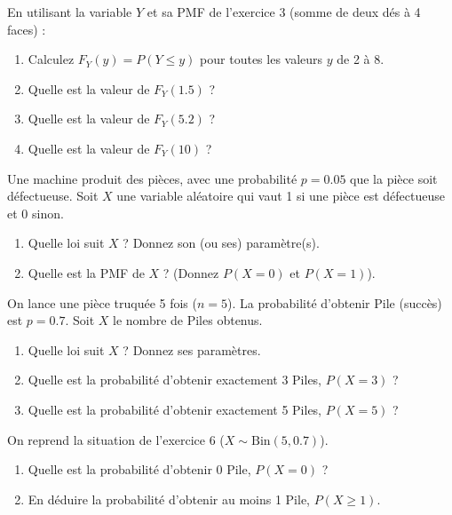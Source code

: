 \begin{exercicebox}
En utilisant la variable $Y$ et sa PMF de l'exercice 3 (somme de deux dés à 4 faces) :
\begin{enumerate}
    \item Calculez $F_Y(y) = P(Y \le y)$ pour toutes les valeurs $y$ de 2 à 8.
    \item Quelle est la valeur de $F_Y(1.5)$ ?
    \item Quelle est la valeur de $F_Y(5.2)$ ?
    \item Quelle est la valeur de $F_Y(10)$ ?
\end{enumerate}
\end{exercicebox}


\begin{exercicebox}
Une machine produit des pièces, avec une probabilité $p=0.05$ que la pièce soit défectueuse. Soit $X$ une variable aléatoire qui vaut 1 si une pièce est défectueuse et 0 sinon.
\begin{enumerate}
    \item Quelle loi suit $X$ ? Donnez son (ou ses) paramètre(s).
    \item Quelle est la PMF de $X$ ? (Donnez $P(X=0)$ et $P(X=1)$).
\end{enumerate}
\end{exercicebox}

\begin{exercicebox}
On lance une pièce truquée 5 fois ($n=5$). La probabilité d'obtenir Pile (succès) est $p=0.7$. Soit $X$ le nombre de Piles obtenus.
\begin{enumerate}
    \item Quelle loi suit $X$ ? Donnez ses paramètres.
    \item Quelle est la probabilité d'obtenir exactement 3 Piles, $P(X=3)$ ?
    \item Quelle est la probabilité d'obtenir exactement 5 Piles, $P(X=5)$ ?
\end{enumerate}
\end{exercicebox}

\begin{exercicebox}
On reprend la situation de l'exercice 6 ($X \sim \text{Bin}(5, 0.7)$).
\begin{enumerate}
    \item Quelle est la probabilité d'obtenir 0 Pile, $P(X=0)$ ?
    \item En déduire la probabilité d'obtenir au moins 1 Pile, $P(X \ge 1)$.
\end{enumerate}
\end{exercicebox}

